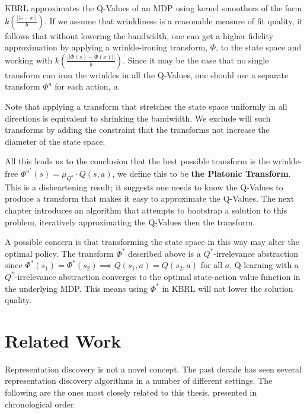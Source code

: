 KBRL approximates the Q-Values of an MDP using kernel smoothers of the form
$k(\frac{||s - x||}{b})$.
If we assume that wrinkliness is a reasonable measure of fit quality,
it follows that without lowering the bandwidth, one can get a higher
fidelity approximation by applying a wrinkle-ironing transform,
$\Phi$, to the state space and working with
$k(\frac{||\Phi(s) - \Phi(x)||}{b})$.
Since it may be the case that no single transform can iron the wrinkles
in all the Q-Values, one should use a separate transform $\Phi^a$ for
each action, $a$.

Note that applying a transform that stretches the state space uniformly in
all directions is equivalent to shrinking the bandwidth.
We exclude will such transforms by adding the constraint that the
transforms not increase the diameter of the state space.

All this leads us to the conclusion that the best possible transform
is the wrinkle-free $\Phi^{a^*}(s) = \mu_{Q^a} \cdot Q(s,a)$, we define
this to be \textbf{the Platonic Transform}.
This is a disheartening result;
it suggests one needs to know the Q-Values to produce a transform that makes
it easy to approximate the Q-Values.
The next chapter introduces an algorithm that attempts to bootstrap a
solution to this problem, iteratively approximating the Q-Values then the
transform.

A possible concern is that transforming the state space in this way may alter
the optimal policy.
The transform $\Phi^*$ described above is a $Q^*$-irrelevance abstraction
\cite{lietal} since
$\Phi^*(s_1) = \Phi^*(s_2) \implies Q(s_1, a) = Q(s_2, a)$ for all $a$.
Q-learning with a $Q^*$-irrelevance
abstraction converges to the optimal state-action value function in the
underlying MDP. 
This means using $\Phi^*$ in KBRL will not lower the solution quality.

\section{Related Work}
Representation discovery is not a novel concept.
The past decade has seen several representation discovery algorithms
in a number of different settings.
The following are the ones most closely related to this thesis,
presented in chronological order.

